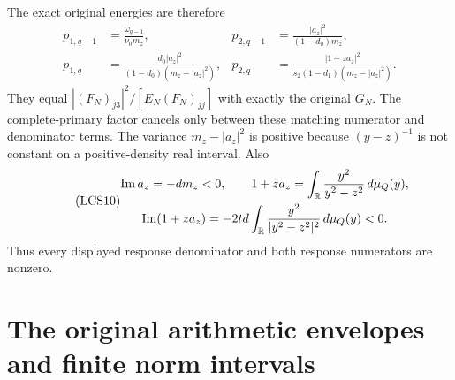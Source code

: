 \documentclass[11pt,a4paper]{article}
\begin{document}
The exact original energies are therefore
\begin{equation}\tag{LCS9}
\boxed{\begin{aligned}
 p_{1,q-1}&=\frac{\omega_{q-1}}{\nu_0m_z},&
 p_{2,q-1}&=\frac{|a_z|^2}{(1-d_0)m_z},\\
 p_{1,q}&=\frac{d_0|a_z|^2}{(1-d_0)(m_z-|a_z|^2)},&
 p_{2,q}&=\frac{|1+za_z|^2}
 {s_2(1-d_1)(m_z-|a_z|^2)}.
\end{aligned}}
\end{equation}
They equal $|(F_N)_{j3}|^2/[E_N(F_N)_{jj}]$ with exactly the
original $G_N$. The complete-primary factor cancels only between
these matching numerator and denominator terms. The variance
$m_z-|a_z|^2$ is positive because $(y-z)^{-1}$ is not constant
on a positive-density real interval. Also
\begin{equation}\tag{LCS10}
\begin{gathered}
 \operatorname{Im}a_z=-dm_z<0,\qquad
 1+za_z=\int_\mathbb R\frac{y^2}{y^2-z^2}\,d\mu_Q(y),\\
 \operatorname{Im}(1+za_z)
       =-2td\int_\mathbb R\frac{y^2}{|y^2-z^2|^2}\,d\mu_Q(y)<0.
\end{gathered}
\end{equation}
Thus every displayed response denominator and both response
numerators are nonzero.

\section{The original arithmetic envelopes and finite norm intervals}
\end{document}
